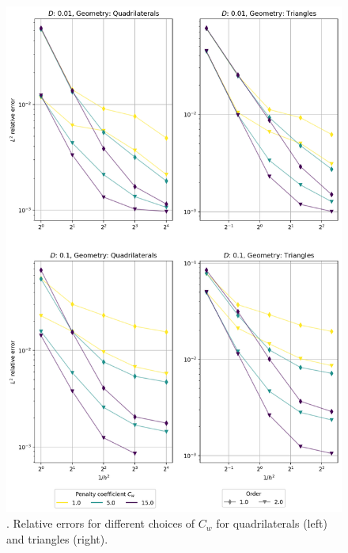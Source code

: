 \begin{figure}[p!]
	\includegraphics[width=\textwidth]{../figs/parametric/burgers_2D/convergence_symmetry}
	\caption{. Relative errors for different choices of $C_w$ for 
	quadrilaterals (left) and triangles (right).}
	\label{fig:kucera_conv}
\end{figure}